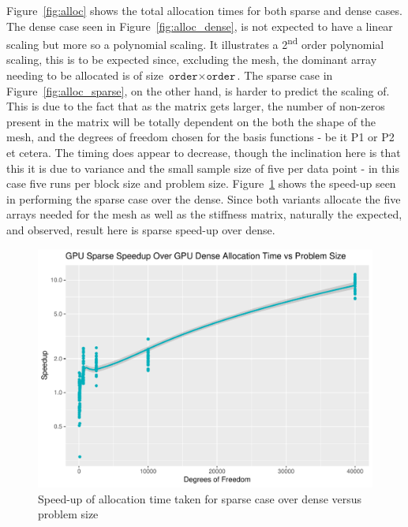 Figure~\ref{fig:alloc} shows the total allocation times for both sparse and dense cases. The dense case seen in Figure~\ref{fig:alloc_dense}, is not expected to have a linear scaling but more so a polynomial scaling. It illustrates a 2\textsuperscript{nd} order polynomial scaling, this is to be expected since, excluding the mesh, the dominant array needing to be allocated is of size $\texttt{order}\times\texttt{order}$. The sparse case in Figure~\ref{fig:alloc_sparse}, on the other hand, is harder to predict the scaling of. This is due to the fact that as the matrix gets larger, the number of non-zeros present in the matrix will be totally dependent on the both the shape of the mesh, and the degrees of freedom chosen for the basis functions - be it P1 or P2 et cetera. The timing does appear to decrease, though the inclination here is that this it is due to variance and the small sample size of five per data point - in this case five runs per block size and problem size. Figure~\ref{fig:alloc_su} shows the speed-up seen in performing the sparse case over the dense. Since both variants allocate the five arrays needed for the mesh as well as the stiffness matrix, naturally the expected, and observed, result here is sparse speed-up over dense.
\begin{figure}
	\centering
	\includegraphics[width=0.48\linewidth]{Plots/alloc_sparse_dense_speedup_vs_n}
	\caption{Speed-up of allocation time taken for sparse case over dense versus problem size}
	\label{fig:alloc_su}
\end{figure}

